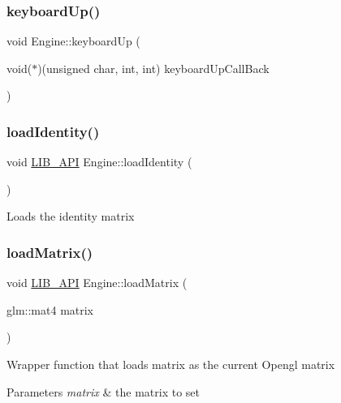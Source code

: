 \subsubsection{\texorpdfstring{keyboard\+Up()}{keyboardUp()}}
{\footnotesize\ttfamily void Engine\+::keyboard\+Up (\begin{DoxyParamCaption}\item[{void($\ast$)(unsigned char, int, int)}]{keyboard\+Up\+Call\+Back }\end{DoxyParamCaption})}

\mbox{\label{classEngine_ab0d411e34b7ec898bd5e29f02feb4644}} 
\subsubsection{\texorpdfstring{load\+Identity()}{loadIdentity()}}
{\footnotesize\ttfamily void \hyperlink{Engine_8h_a77278c8cc96e39fb27b5d0a347c8fb3d}{L\+I\+B\+\_\+\+A\+PI} Engine\+::load\+Identity (\begin{DoxyParamCaption}{ }\end{DoxyParamCaption})}

Loads the identity matrix \mbox{\label{classEngine_a033a7a3b7697c9998270276bf659ac89}} 
\subsubsection{\texorpdfstring{load\+Matrix()}{loadMatrix()}}
{\footnotesize\ttfamily void \hyperlink{Engine_8h_a77278c8cc96e39fb27b5d0a347c8fb3d}{L\+I\+B\+\_\+\+A\+PI} Engine\+::load\+Matrix (\begin{DoxyParamCaption}\item[{glm\+::mat4}]{matrix }\end{DoxyParamCaption})}

Wrapper function that loads matrix as the current Opengl matrix 
\begin{DoxyParams}{Parameters}
{\em matrix} & the matrix to set \\
\hline
\end{DoxyParams}
\mbox{\label{classEngine_a649eaa6139ab7b66d2d5ac541ac2f069}} 
